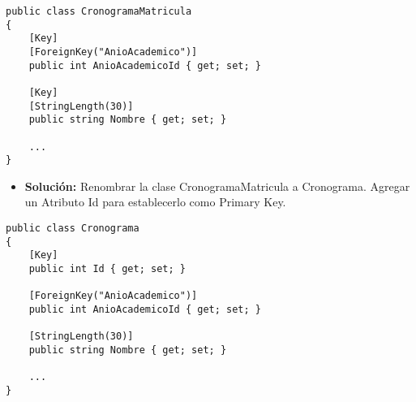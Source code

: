 \begin{lstlisting}[language={[Sharp]C}]
public class CronogramaMatricula
{
	[Key]
	[ForeignKey("AnioAcademico")]
	public int AnioAcademicoId { get; set; }
	
	[Key]
	[StringLength(30)]
	public string Nombre { get; set; }
	
	...
}
\end{lstlisting}

\begin{itemize}
	\item \textbf{Solución:} Renombrar la clase CronogramaMatricula a Cronograma. Agregar un Atributo Id para establecerlo como Primary Key.
\end{itemize}
\begin{lstlisting}[language={[Sharp]C}]
public class Cronograma
{
	[Key]
	public int Id { get; set; }

	[ForeignKey("AnioAcademico")]
	public int AnioAcademicoId { get; set; }
	
	[StringLength(30)]
	public string Nombre { get; set; }
	
	...
}
\end{lstlisting}